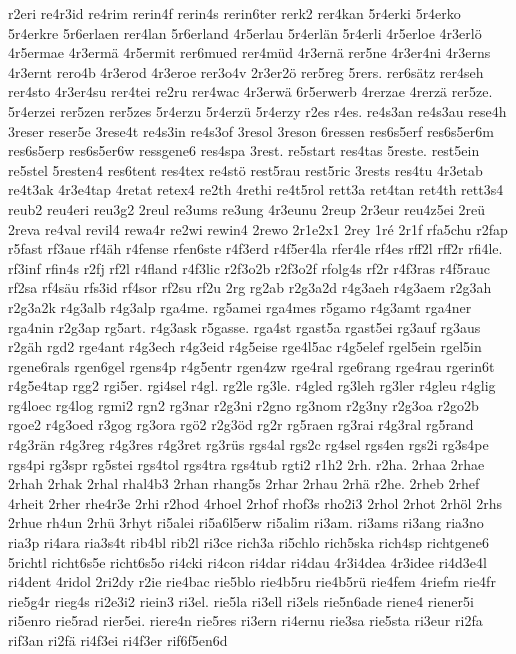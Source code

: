 {r2eri
re4r3id
re4rim
rerin4f
rerin4s
rerin6ter
rerk2
rer4kan
5r4erki
5r4erko
5r4erkre
5r6erlaen
rer4lan
5r6erland
4r5erlau
5r4erlän
5r4erli
4r5erloe
4r3erlö
4r5ermae
4r3ermä
4r5ermit
rer6mued
rer4müd
4r3ernä
rer5ne
4r3er4ni
4r3erns
4r3ernt
rero4b
4r3erod
4r3eroe
rer3o4v
2r3er2ö
rer5reg
5rers.
rer6sätz
rer4seh
rer4sto
4r3er4su
rer4tei
re2ru
rer4wac
4r3erwä
6r5erwerb
4rerzae
4rerzä
rer5ze.
5r4erzei
rer5zen
rer5zes
5r4erzu
5r4erzü
5r4erzy
r2es
r4es.
re4s3an
re4s3au
rese4h
3reser
reser5e
3rese4t
re4s3in
re4s3of
3resol
3reson
6ressen
res6s5erf
res6s5er6m
res6s5erp
res6s5er6w
ressgene6
res4spa
3rest.
re5start
res4tas
5reste.
rest5ein
re5stel
5resten4
res6tent
res4tex
re4stö
rest5rau
rest5ric
3rests
res4tu
4r3etab
re4t3ak
4r3e4tap
4retat
retex4
re2th
4rethi
re4t5rol
rett3a
ret4tan
ret4th
rett3s4
reub2
reu4eri
reu3g2
2reul
re3ums
re3ung
4r3eunu
2reup
2r3eur
reu4z5ei
2reü
2reva
re4val
revil4
rewa4r
re2wi
rewin4
2rewo
2r1e2x1
2rey
1ré
2r1f
rfa5chu
r2fap
r5fast
rf3aue
rf4äh
r4fense
rfen6ste
r4f3erd
r4f5er4la
rfer4le
rf4es
rff2l
rff2r
rfi4le.
rf3inf
rfin4s
r2fj
rf2l
r4fland
r4f3lic
r2f3o2b
r2f3o2f
rfolg4s
rf2r
r4f3ras
r4f5rauc
rf2sa
rf4säu
rfs3id
rf4sor
rf2su
rf2u
2rg
rg2ab
r2g3a2d
r4g3aeh
r4g3aem
r2g3ah
r2g3a2k
r4g3alb
r4g3alp
rga4me.
rg5amei
rga4mes
r5gamo
r4g3amt
rga4ner
rga4nin
r2g3ap
rg5art.
r4g3ask
r5gasse.
rga4st
rgast5a
rgast5ei
rg3auf
rg3aus
r2gäh
rgd2
rge4ant
r4g3ech
r4g3eid
r4g5eise
rge4l5ac
r4g5elef
rgel5ein
rgel5in
rgene6rals
rgen6gel
rgens4p
r4g5entr
rgen4zw
rge4ral
rge6rang
rge4rau
rgerin6t
r4g5e4tap
rgg2
rgi5er.
rgi4sel
r4gl.
rg2le
rg3le.
r4gled
rg3leh
rg3ler
r4gleu
r4glig
rg4loec
rg4log
rgmi2
rgn2
rg3nar
r2g3ni
r2gno
rg3nom
r2g3ny
r2g3oa
r2go2b
rgoe2
r4g3oed
r3gog
rg3ora
rgö2
r2g3öd
rg2r
rg5raen
rg3rai
r4g3ral
rg5rand
r4g3rän
r4g3reg
r4g3res
r4g3ret
rg3rüs
rgs4al
rgs2c
rg4sel
rgs4en
rgs2i
rg3s4pe
rgs4pi
rg3spr
rg5stei
rgs4tol
rgs4tra
rgs4tub
rgti2
r1h2
2rh.
r2ha.
2rhaa
2rhae
2rhah
2rhak
2rhal
rhal4b3
2rhan
rhang5s
2rhar
2rhau
2rhä
r2he.
2rheb
2rhef
4rheit
2rher
rhe4r3e
2rhi
r2hod
4rhoel
2rhof
rhof3s
rho2i3
2rhol
2rhot
2rhöl
2rhs
2rhue
rh4un
2rhü
3rhyt
ri5alei
ri5a6l5erw
ri5alim
ri3am.
ri3ams
ri3ang
ria3no
ria3p
ri4ara
ria3s4t
rib4bl
rib2l
ri3ce
rich3a
ri5chlo
rich5ska
rich4sp
richtgene6
5richtl
richt6s5e
richt6s5o
ri4cki
ri4con
ri4dar
ri4dau
4r3i4dea
4r3idee
ri4d3e4l
ri4dent
4ridol
2ri2dy
r2ie
rie4bac
rie5blo
rie4b5ru
rie4b5rü
rie4fem
4riefm
rie4fr
rie5g4r
rieg4s
ri2e3i2
riein3
ri3el.
rie5la
ri3ell
ri3els
rie5n6ade
riene4
riener5i
ri5enro
rie5rad
rier5ei.
riere4n
rie5res
ri3ern
ri4ernu
rie3sa
rie5sta
ri3eur
ri2fa
rif3an
ri2fä
ri4f3ei
ri4f3er
rif6f5en6d
}
